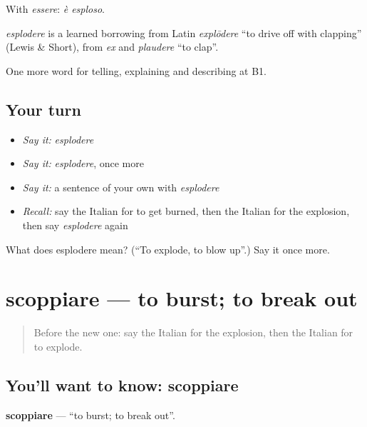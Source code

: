 With \emph{essere}: \emph{è esploso}.

\begin{cousinweb}
\emph{esplodere} is a learned borrowing from Latin \emph{explōdere} \textquotedblleft{}to drive off with clapping\textquotedblright{} (Lewis \& Short), from \emph{ex} and \emph{plaudere} \textquotedblleft{}to clap\textquotedblright{}.
\end{cousinweb}

\begin{grammarlens}[title={What you've built}]
One more word for telling, explaining and describing at B1.
\end{grammarlens}

\subsection*{Your turn}
\begin{itemize}
\raggedright
  \item \emph{Say it:} \emph{esplodere}
  \item \emph{Say it:} \emph{esplodere}, once more
  \item \emph{Say it:} a sentence of your own with \emph{esplodere}
  \item \emph{Recall:} say the Italian for to get burned, then the Italian for the explosion, then say \emph{esplodere} again
\end{itemize}

\begin{tcolorbox}[breakable,colback=teal!4,colframe=teal!35!black,title={Before you move on}]
What does esplodere mean? (\textquotedblleft{}To explode, to blow up\textquotedblright{}.) Say it once more.
\end{tcolorbox}
\section[scoppiare]{scoppiare — to burst; to break out}

\label{lesson:IT-C303-scoppiare}



\begin{quote}
Before the new one: say the Italian for the explosion, then the Italian for to explode.
\end{quote}

\subsection*{You'll want to know: scoppiare}
\textbf{scoppiare} — \textquotedblleft{}to burst; to break out\textquotedblright{}.

